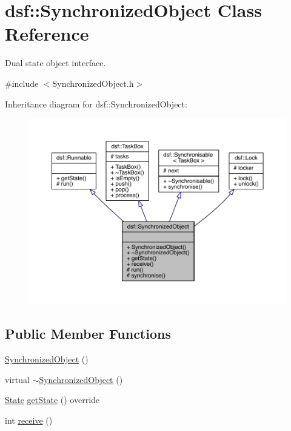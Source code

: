 \hypertarget{classdsf_1_1_synchronized_object}{}\section{dsf\+:\+:Synchronized\+Object Class Reference}
\label{classdsf_1_1_synchronized_object}


Dual state object interface.  




{\ttfamily \#include $<$Synchronized\+Object.\+h$>$}



Inheritance diagram for dsf\+:\+:Synchronized\+Object\+:\nopagebreak
\begin{figure}[H]
\begin{center}
\leavevmode
\includegraphics[width=350pt]{classdsf_1_1_synchronized_object__inherit__graph}
\end{center}
\end{figure}
\subsection*{Public Member Functions}
\begin{DoxyCompactItemize}
\item 
\hyperlink{classdsf_1_1_synchronized_object_a3f1d2def677e6d814de4d0bd2aa3d95b}{Synchronized\+Object} ()
\item 
virtual \hyperlink{classdsf_1_1_synchronized_object_a0181452530628f24baad25eea03580f9}{$\sim$\+Synchronized\+Object} ()
\item 
\hyperlink{classdsf_1_1_runnable_a8eb63b21a0accc7a6a2a05f18e257991}{State} \hyperlink{classdsf_1_1_synchronized_object_a9fbf045eff345188935402ae576933eb}{get\+State} () override
\item 
int \hyperlink{classdsf_1_1_synchronized_object_a3ce496c6aaecc4b0ca3a4d09539a4920}{receive} ()
\end{DoxyCompactItemize}
